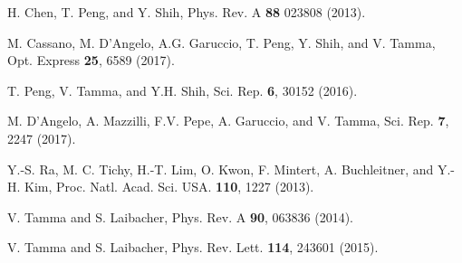 \documentclass[aps,prl,reprint,showpacs,superscriptaddress]{revtex4-1}
\begin{document}
\begin{thebibliography}{99}
H. Chen, T. Peng, and Y. Shih, Phys. Rev. A \textbf{88} 023808 (2013).

   
M. Cassano, M. D'Angelo, A.G. Garuccio, T. Peng, Y. Shih, and V. Tamma, Opt. Express \textbf{25}, 6589 (2017). 

T. Peng, V. Tamma, and Y.H. Shih, Sci. Rep. \textbf{6}, 30152 (2016).

M. D'Angelo, A. Mazzilli, F.V. Pepe, A. Garuccio, and V. Tamma, Sci. Rep. \textbf{7}, 2247 (2017).


Y.-S. Ra, M. C. Tichy, H.-T. Lim, O. Kwon, F. Mintert, A. Buchleitner, and Y.-H. Kim, Proc. Natl. Acad. Sci.
USA.  \textbf{110}, 1227 (2013).

V. Tamma and S. Laibacher, Phys. Rev. A \textbf{90}, 063836 (2014).

V. Tamma and S. Laibacher, Phys. Rev. Lett. \textbf{114}, 243601 (2015).



   
\end{thebibliography}
\end{document}
